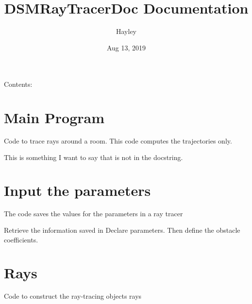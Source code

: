 \documentclass[letterpaper,10pt,english]{sphinxmanual}
\title{DSMRayTracerDoc Documentation}
\date{Aug 13, 2019}
\author{Hayley}
\begin{document}
\maketitle
\tableofcontents
{}\label{index::doc}


Contents:


\chapter{Main Program}
\label{index:welcome-to-dsmraytracerdoc-s-documentation}\label{index:main-program}\label{index:module-RayTracerMainProgram}
Code to trace rays around a room. This code computes the trajectories only.

This is something I want to say that is not in the docstring.


\chapter{Input the parameters}
\label{index:input-the-parameters}\label{index:module-ParameterInput}
The code saves the values for the parameters in a ray tracer

\begin{fulllineitems}
\label{index:ParameterInput.ObstacleCoefficients}
Retrieve the information saved in Declare parameters. Then define the obstacle coefficients.

\end{fulllineitems}



\chapter{Rays}
\label{index:module-Rays}\label{index:rays}
Code to construct the ray-tracing objects rays
\end{document}
